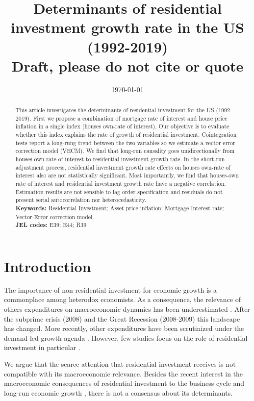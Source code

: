 \documentclass[12pt, a4paper]{article}
\author{}
\date{\today}
\title{Determinants of residential investment growth rate in the US (1992-2019)\\\medskip
\large Draft, please do not cite or quote}
\begin{document}
\maketitle



\begin{abstract}
This article investigates the determinants of residential investment for the US (1992-2019).
First we propose a combination of mortgage rate of interest and house price inflation in a single index (houses own-rate of interest).
Our objective is to evaluate whether this index explains the rate of growth of residential investment.
Cointegration tests report a long-rung trend between the two variables so we estimate a vector error correction model (VECM).
We find that long-run causality goes unidirectionally from houses own-rate of interest to residential investment growth rate.
In the short-run adjustment process, residential investment growth rate effects on houses own-rate of interest also are not statistically significant.
Most importantly, we find that houses-own rate of interest and residential investment growth rate have a negative correlation.
Estimation results are not sensible to lag order specification and residuals do not present serial autocorrelation nor heterocedasticity.
\\
\noindent \textbf{Keywords:} Residential Investment; Asset price inflation; Mortgage Interest rate; Vector-Error correction model\\
\noindent \textbf{JEL codes:} E39; E44; R39
\end{abstract}


\section{Introduction}
\label{sec:orgb3d8adb}
\label{sec:Introduction}
The importance of non-residential investment for economic growth is a commonplace among heterodox economists.
As a consequence, the relevance of others expenditures on macroeconomic dynamics has been underestimated \cite{brochier_macroeconomics_2017}.
After the subprime crisis (2008) and the Great Recession (2008-2009) this landscape has changed.
More recently, other expenditures have been scrutinized under the demand-led growth agenda \cites{freitas_pattern_2013}{girardi_long-run_2016}{girardi_autonomous_2018}{braga_investment_2018}.
However, few studies focus on the role of residential investment in particular \cite{petrini_2021_TD}.

We argue that the scarce attention that residential investment receives is not compatible with its macroeconomic relevance.
Besides the recent interest in the macroeconomic consequences of residential investment to the business cycle and long-run economic growth \cite{fiebiger_trend_2017,fiebiger_semi-autonomous_2018,perez_Montiel_2021}, there is not a consensus about its determinants.
\end{document}
